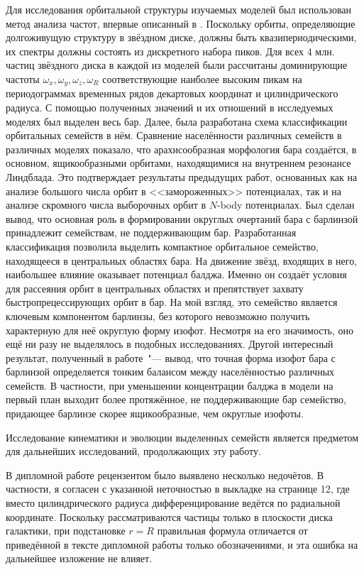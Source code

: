 \documentclass{trlnotes}
\begin{document}
Для исследования орбитальной структуры изучаемых моделей был использован метод анализа частот, впервые описанный в \citet{binney1982}.
Поскольку орбиты, определяющие долгоживущую структуру в звёздном диске, должны быть квазипериодическими, их спектры должны состоять из
дискретного набора пиков. Для всех 4 млн. частиц звёздного диска в каждой из моделей были рассчитаны доминирующие частоты
$ω_x, ω_y, ω_z, ω_R$ соответствующие наиболее высоким пикам на периодограммах временных рядов декартовых координат и цилиндрического радиуса. 
С помощью полученных значений и их отношений в исследуемых моделях был выделен весь бар. 
Далее, была разработана схема классификации орбитальных семейств в нём.
Сравнение населённости различных семейств в различных моделях показало, что арахисообразная морфология бара создаётся, в 
основном, ящикообразными орбитами, находящимися на внутреннем резонансе Линдблада. Это подтверждает результаты предыдущих работ, основанных как на анализе большого числа орбит в <<замороженных>> потенциалах, так и на анализе скромного числа выборочных орбит в $N$-body потенциалах. 
Был сделан вывод, что основная роль в формировании округлых очертаний бара с барлинзой принадлежит семействам, не поддерживающим бар. 
Разработанная классификация позволила выделить компактное орбитальное семейство, находящееся в центральных областях бара. 
На движение звёзд, входящих в него, наибольшее влияние оказывает потенциал балджа. 
Именно он создаёт условия для рассеяния орбит в центральных областях и препятствует захвату быстропрецессирующих орбит в бар.
На мой взгляд, это семейство является ключевым компонентом барлинзы, без которого невозможно получить характерную для неё округлую форму изофот.
Несмотря на его значимость, оно ещё ни разу не выделялось в подобных исследованиях.
Другой интересный результат, полученный в работе~"--- вывод, что точная форма изофот бара с барлинзой определяется тонким балансом между
населённостью различных семейств. В частности, при уменьшении концентрации балджа в модели на первый план выходит более протяжённое, 
не поддерживающие бар семейство, придающее барлинзе скорее ящикообразные, чем округлые изофоты. 

Исследование кинематики и эволюции выделенных семейств является предметом для дальнейших исследований, продолжающих эту работу.



\newpage
В дипломной работе рецензентом было выявлено несколько недочётов.
В частности, я согласен с указанной неточностью в выкладке на странице 12, где вместо цилиндрического радиуса 
дифференцирование ведётся по радиальной координате. Поскольку рассматриваются частицы только в плоскости диска
галактики, при подстановке $r=R$ правильная формула отличается от приведённой в тексте дипломной работы только
обозначениями, и эта ошибка на дальнейшее изложение не влияет.
\end{document}
